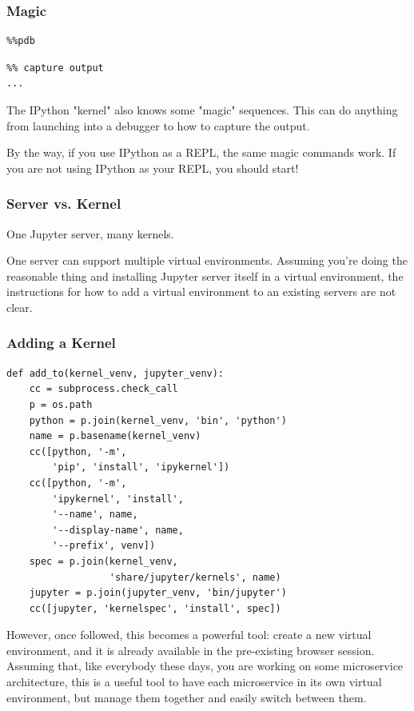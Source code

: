 \begin{frame}[fragile]
\frametitle{Magic}

\begin{lstlisting}
%%pdb
\end{lstlisting}

\begin{lstlisting}
%% capture output
...
\end{lstlisting}

\end{frame}

The IPython "kernel" also knows some "magic" sequences.
This can do anything from launching into a debugger
to how to capture the output.

By the way,
if you use IPython as a REPL,
the same magic commands work.
If you are not using IPython as your REPL,
you should start!

\begin{frame}[fragile]
\frametitle{Server vs. Kernel}

One Jupyter server,
many kernels.

\end{frame} 

One server can support multiple virtual environments.
Assuming you're doing the reasonable thing and installing
Jupyter server itself in a virtual environment,
the instructions for how to add a virtual environment
to an existing servers are not clear.

\begin{frame}[fragile]
\frametitle{Adding a Kernel}

\begin{lstlisting}
def add_to(kernel_venv, jupyter_venv):
    cc = subprocess.check_call
    p = os.path
    python = p.join(kernel_venv, 'bin', 'python')
    name = p.basename(kernel_venv)
    cc([python, '-m',
        'pip', 'install', 'ipykernel'])
    cc([python, '-m',
        'ipykernel', 'install',
        '--name', name,
        '--display-name', name,
        '--prefix', venv])
    spec = p.join(kernel_venv,
                  'share/jupyter/kernels', name)
    jupyter = p.join(jupyter_venv, 'bin/jupyter')
    cc([jupyter, 'kernelspec', 'install', spec])
\end{lstlisting}
\end{frame}


However,
once followed,
this becomes a powerful tool:
create a new virtual environment,
and it is already available in the pre-existing browser session.
Assuming that,
like everybody these days,
you are working on some microservice architecture,
this is a useful tool to have each microservice in its own virtual environment,
but manage them together and easily switch between them.


